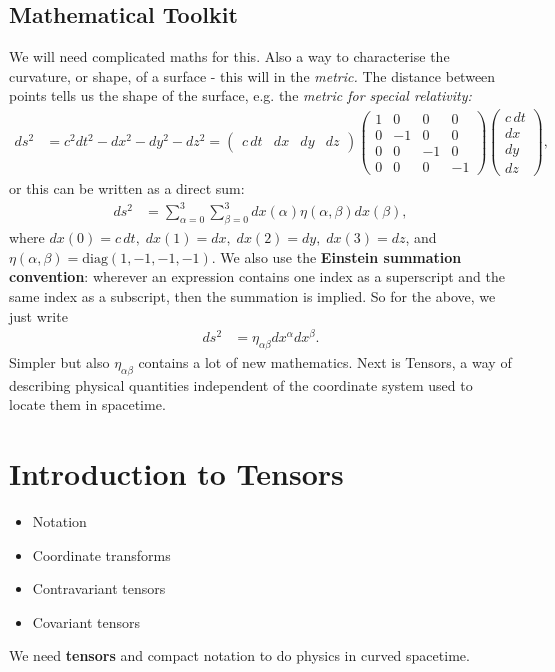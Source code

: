 \documentclass[a4paper, 11pt, normalem]{report}
\begin{document}
\section{Mathematical Toolkit}
We will need complicated maths for this. 
Also a way to characterise the curvature, or shape, of a surface - this will in the \emph{metric.}
The distance between points tells us the shape of the surface, e.g. the \emph{metric for special relativity:}
\begin{align}
    ds^2 &= c^2dt^2-dx^2-dy^2-dz^2 = \begin{pmatrix} c\,dt & dx & dy & dz \end{pmatrix}\begin{pmatrix} 1 & 0 & 0 & 0 \\ 0 & -1 & 0 & 0 \\ 0 & 0 & -1 & 0 \\ 0 & 0 & 0 & -1 \end{pmatrix}\begin{pmatrix} c\,dt \\ dx \\ dy \\ dz\end{pmatrix},
\end{align}
or this can be written as a direct sum:
\begin{align}
    ds^2 &= \sum_{\alpha=0}^3 \sum_{\beta=0}^3 dx(\alpha)\eta(\alpha,\beta)dx(\beta),
\end{align}
where $dx(0)=c\,dt,\; dx(1)=dx,\; dx(2)=dy,\; dx(3)=dz$, and $\eta(\alpha,\beta)=\text{diag}(1,-1,-1,-1)$.
We also use the \textbf{Einstein summation convention}: wherever an expression contains one index as a superscript and the same index as a subscript, then the summation is implied. 
So for the above, we just write
\begin{align}
    ds^2 &= \eta_{\alpha\beta}dx^\alpha dx^\beta.
\end{align}
Simpler but also $\eta_{\alpha\beta}$ contains a lot of new mathematics. 
Next is Tensors, a way of describing physical quantities independent of the coordinate system used to locate them in spacetime.


\chapter{Introduction to Tensors}
\begin{itemize}
    \item Notation
    \item Coordinate transforms
    \item Contravariant tensors
    \item Covariant tensors
\end{itemize}
We need \textbf{tensors} and compact notation to do physics in curved spacetime.
\end{document}
